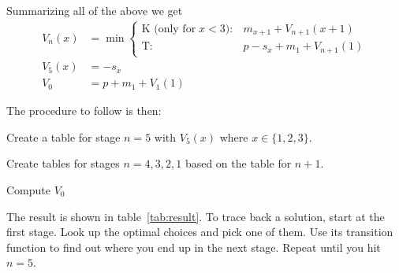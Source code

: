 \documentclass[a4paper]{article}
\begin{document}
Summarizing all of the above we get
\begin{align}
  V_n(x)
  &=
  \min
  \begin{cases}
    \text{K (only for}\; x < 3):
    &
    m_{x+1} + V_{n+1}(x+1)
    \\
    \text{T:}
    &
    p - s_x + m_1 + V_{n+1}(1)
  \end{cases}
  \\
  V_5(x)
  &=
  -s_x
  \\
  V_0
  &=
  p + m_1 + V_1(1)
\end{align}

The procedure to follow is then:
\begin{compactenum}
\item
  Create a table for stage $n=5$ with $V_5(x)$ where $x\in\{1,2,3\}$.
\item
  Create tables for stages $n=4,3,2,1$ based on the table for $n+1$.
\item
  Compute $V_0$
\end{compactenum}

The result is shown in table~\ref{tab:result}.
To trace back a solution, start at the first stage.
Look up the optimal choices and pick one of them.
Use its transition function to find out where you end up in the next stage.
Repeat until you hit $n=5$.
\end{document}

